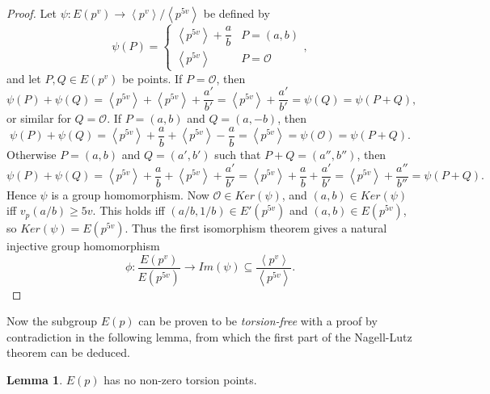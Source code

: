 \documentclass{article}
\newcommand{\rb}[1]{\left( #1 \right)}
\newcommand{\ab}[1]{\left\langle #1 \right\rangle}
\theoremstyle{definition}
\newtheorem{lemma}[proposition]{Lemma}
\begin{document}
\begin{proof}
Let $ \psi : E\rb{p^v} \to \ab{p^v} / \ab{p^{5v}} $ be defined by
$$ \psi\rb{P} = \begin{cases} \ab{p^{5v}} + \dfrac{a}{b} & P = \rb{a, b} \\ \ab{p^{5v}} & P = \mathcal{O} \end{cases}, $$
and let $ P, Q \in E\rb{p^v} $ be points. If $ P = \mathcal{O} $, then
$$ \psi\rb{P} + \psi\rb{Q} = \ab{p^{5v}} + \ab{p^{5v}} + \dfrac{a'}{b'} = \ab{p^{5v}} + \dfrac{a'}{b'} = \psi\rb{Q} = \psi\rb{P + Q}, $$
or similar for $ Q = \mathcal{O} $. If $ P = \rb{a, b} $ and $ Q = \rb{a, -b} $, then
$$ \psi\rb{P} + \psi\rb{Q} = \ab{p^{5v}} + \dfrac{a}{b} + \ab{p^{5v}} - \dfrac{a}{b} = \ab{p^{5v}} = \psi\rb{\mathcal{O}} = \psi\rb{P + Q}. $$
Otherwise $ P = \rb{a, b} $ and $ Q = \rb{a', b'} $ such that $ P + Q = \rb{a'', b''} $, then
$$ \psi\rb{P} + \psi\rb{Q} = \ab{p^{5v}} + \dfrac{a}{b} + \ab{p^{5v}} + \dfrac{a'}{b'} = \ab{p^{5v}} + \dfrac{a}{b} + \dfrac{a'}{b'} = \ab{p^{5v}} + \dfrac{a''}{b''} = \psi\rb{P + Q}. $$
Hence $ \psi $ is a group homomorphism. Now $ \mathcal{O} \in Ker\rb{\psi} $, and $ \rb{a, b} \in Ker\rb{\psi} $ iff $ v_p\rb{a / b} \ge 5v $. This holds iff $ \rb{a / b, 1 / b} \in E'\rb{p^{5v}} $ and $ \rb{a, b} \in E\rb{p^{5v}} $, so $ Ker\rb{\psi} = E\rb{p^{5v}} $. Thus the first isomorphism theorem gives a natural injective group homomorphism
$$ \phi : \dfrac{E\rb{p^v}}{E\rb{p^{5v}}} \to Im\rb{\psi} \subseteq \dfrac{\ab{p^v}}{\ab{p^{5v}}}. $$
\end{proof}

Now the subgroup $ E\rb{p} $ can be proven to be \emph{torsion-free} with a proof by contradiction in the following lemma, from which the first part of the Nagell-Lutz theorem can be deduced.

\begin{lemma}
$ E\rb{p} $ has no non-zero torsion points.
\end{lemma}
\end{document}
